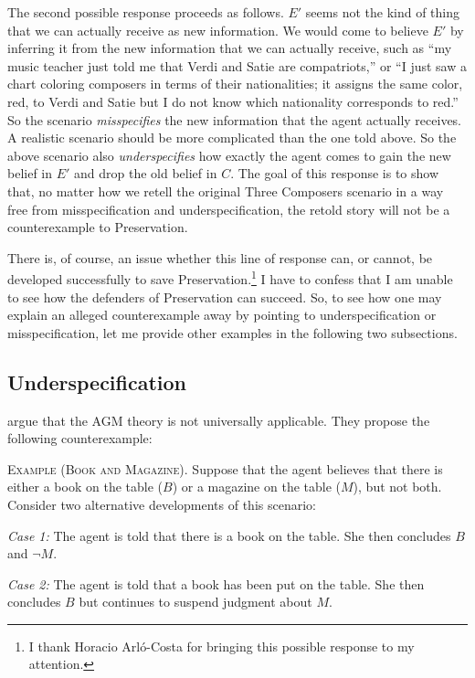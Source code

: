 The second possible response proceeds as follows. $E'$ seems not the kind of thing that we can actually receive as new information. We would come to believe $E'$ by inferring it from the new information that we can actually receive, such as ``my music teacher just told me that Verdi and Satie are compatriots,'' or ``I just saw a chart coloring composers in terms of their nationalities; it assigns the same color, red, to Verdi and Satie but I do not know which nationality corresponds to red.'' So the scenario {\em misspecifies} the new information that the agent actually receives. A realistic scenario should be more complicated than the one told above. So the above scenario also {\em underspecifies} how exactly the agent comes to gain the new belief in $E'$ and drop the old belief in $C$. The goal of this response is to show that, no matter how we retell the original Three Composers scenario in a way free from misspecification and underspecification, the retold story will not be a counterexample to Preservation. 

There is, of course, an issue whether this line of response can, or cannot, be developed successfully to save Preservation.\footnote
	{I thank Horacio Arl\'{o}-Costa for bringing this possible response to my attention.} 
I have to confess that I am unable to see how the defenders of Preservation can succeed. So, to see how one may explain an alleged counterexample away by pointing to underspecification or misspecification, let me provide other examples in the following two subsections.


\subsection{Underspecification}

\citet*{katsuno2003difference} argue that the AGM theory is not universally applicable. They propose the following counterexample: \op

	\xm \textsc{Example (Book and Magazine).} Suppose that the agent believes that there is either a book on the table ($B$) or a magazine on the table ($M$), but not both. Consider two alternative developments of this scenario:

	{\em Case 1:} The agent is told that there is a book on the table. She then concludes $B$ and $\neg M$.

	{\em Case 2:} The agent is told that a book has been put on the table. She then concludes $B$ but continues to suspend judgment about $M$. 


